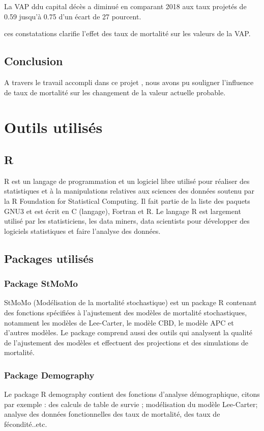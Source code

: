 \documentclass{article}
\begin{document}
{{\large La VAP ddu capital décès a diminué en comparant 2018 aux taux projetés de 0.59 jusqu'à 0.75 d'un écart de 27 pourcent. }

{\large ces constatations clarifie l'effet des taux de mortalité sur les valeurs de la VAP.}
\subsection {Conclusion}
{\large A travers le travail accompli dans ce projet , nous avons pu souligner l'influence de taux de mortalité sur les changement de la valeur actuelle probable.}
\section{Outils utilisés}
\subsection {R}
{\large R est un langage de programmation et un logiciel libre utilisé pour réaliser des  statistiques et à la manipulations relatives aux sciences des données soutenu par la R Foundation for Statistical Computing. Il fait partie de la liste des paquets GNU3 et est écrit en C (langage), Fortran et R.
Le langage R est largement utilisé par les statisticiens, les data miners, data scientists pour développer des logiciels statistiques et faire l'analyse des données.}
\subsection{Packages utilisés}
\subsubsection{ Package StMoMo}
{\large StMoMo (Modélisation de la mortalité stochastique) est un package R contenant des fonctions spécifiées à l'ajustement des modèles de mortalité stochastiques, notamment les modèles de Lee-Carter, le modèle CBD, le modèle APC et d'autres modèles. Le package comprend aussi des outils qui analysent la qualité de l'ajustement des modèles et effectuent des projections et des simulations de mortalité. }
\subsubsection{Package Demography}
{\large Le package R demography contient des fonctions d'analyse démographique, citons par exemple : des calculs de table de survie ; modélisation du modèle Lee-Carter; analyse des données fonctionnelles des taux de mortalité, des taux de fécondité..etc.
}}
\end{document}

